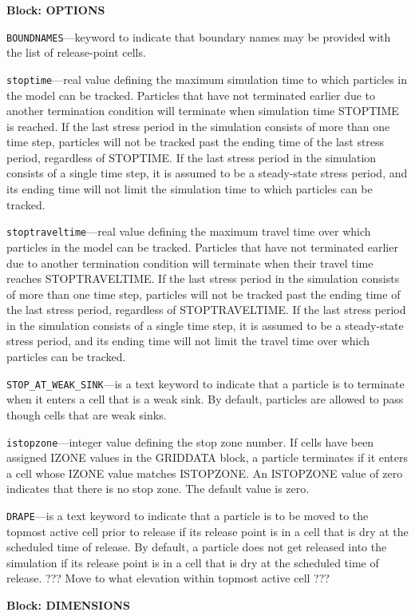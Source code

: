 
\item \textbf{Block: OPTIONS}

\begin{description}
\item \texttt{BOUNDNAMES}---keyword to indicate that boundary names may be provided with the list of release-point cells.

\item \texttt{stoptime}---real value defining the maximum simulation time to which particles in the model can be tracked.  Particles that have not terminated earlier due to another termination condition will terminate when simulation time STOPTIME is reached.  If the last stress period in the simulation consists of more than one time step, particles will not be tracked past the ending time of the last stress period, regardless of STOPTIME.  If the last stress period in the simulation consists of a single time step, it is assumed to be a steady-state stress period, and its ending time will not limit the simulation time to which particles can be tracked.

\item \texttt{stoptraveltime}---real value defining the maximum travel time over which particles in the model can be tracked.  Particles that have not terminated earlier due to another termination condition will terminate when their travel time reaches STOPTRAVELTIME.  If the last stress period in the simulation consists of more than one time step, particles will not be tracked past the ending time of the last stress period, regardless of STOPTRAVELTIME.  If the last stress period in the simulation consists of a single time step, it is assumed to be a steady-state stress period, and its ending time will not limit the travel time over which particles can be tracked.

\item \texttt{STOP\_AT\_WEAK\_SINK}---is a text keyword to indicate that a particle is to terminate when it enters a cell that is a weak sink.  By default, particles are allowed to pass though cells that are weak sinks.

\item \texttt{istopzone}---integer value defining the stop zone number.  If cells have been assigned IZONE values in the GRIDDATA block, a particle terminates if it enters a cell whose IZONE value matches ISTOPZONE.  An ISTOPZONE value of zero indicates that there is no stop zone.  The default value is zero.

\item \texttt{DRAPE}---is a text keyword to indicate that a particle is to be moved to the topmost active cell prior to release if its release point is in a cell that is dry at the scheduled time of release.  By default, a particle does not get released into the simulation if its release point is in a cell that is dry at the scheduled time of release.  ??? Move to what elevation within topmost active cell ???

\end{description}
\item \textbf{Block: DIMENSIONS}

